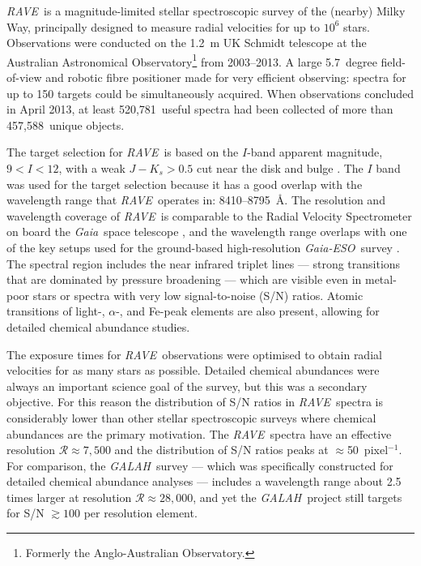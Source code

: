 \documentclass[preprint]{aastex}
\newcommand{\acronym}[1]{{\small{#1}}}
\newcommand{\project}[1]{\textsl{#1}}
\newcommand{\gaia}{\project{Gaia}}
\newcommand{\rave}{\project{\acronym{RAVE}}}
\newcommand{\galah}{\project{\acronym{GALAH}}}
\newcommand{\ges}{\project{Gaia-ESO}}
\newcommand{\Nspectra}{520,781}
\newcommand{\Nstars}{457,588}
\begin{document}
\rave\ is a magnitude-limited stellar spectroscopic survey of the (nearby) Milky Way,
principally designed to measure radial velocities for up to $10^6$ stars.
Observations were conducted on the 1.2~m UK Schmidt telescope at the Australian 
Astronomical Observatory\footnote{Formerly the Anglo-Australian Observatory.} from 
2003--2013.  A large 5.7~degree field-of-view and robotic fibre positioner made for 
very efficient observing:  spectra for up to 150 targets could be simultaneously
acquired.  When observations concluded in April 2013, at least \Nspectra\ useful 
spectra had been collected of more than \Nstars\ unique objects. 


The target selection for \rave\ is based on the $I$-band apparent magnitude,
$9 < I < 12$, with a weak $J - K_s > 0.5$ cut near the disk and bulge \citep{Wojno_2016}.  
The $I$ band was used for the target selection because it has a good overlap with the
wavelength range that \rave\ operates in:  8410--8795~\AA.  The resolution and 
wavelength coverage of \rave\ is comparable to the Radial Velocity Spectrometer on
board the \gaia\ space telescope \citep{Munari_2005,Kordopatis_2011,Recio-Blanco_2016}, 
and the wavelength range overlaps with one of the key setups used for the ground-based 
high-resolution \ges\ survey \citep{Gilmore_2012,Randich_2013}.  The spectral region 
includes the  near infrared triplet lines --- strong transitions that 
are dominated by pressure broadening --- which are visible even in metal-poor stars
or spectra with very low signal-to-noise (S/N) ratios.  Atomic transitions of 
light-, $\alpha$-, and Fe-peak elements are also present, allowing for detailed 
chemical abundance studies.


The exposure times for \rave\ observations were optimised to obtain radial 
velocities for as many stars as possible.  Detailed chemical abundances were
always an important science goal of the survey, but this was a secondary objective.  
For this reason the distribution of S/N ratios in \rave\ spectra is considerably 
lower than other stellar spectroscopic surveys where chemical abundances are the 
primary motivation.  The \rave\ spectra have an effective resolution 
$\mathcal{R} \approx 7{,}500$ and the distribution of S/N ratios peaks at 
$\approx$50~pixel$^{-1}$.  For comparison, the \galah\ survey 
\citep{DeSilva_2015} --- which was specifically constructed for detailed chemical 
abundance analyses --- includes a wavelength range about 2.5 times larger at 
resolution $\mathcal{R} \approx 28{,}000$, and yet the \galah\ project still 
targets for S/N $\gtrsim100$ per resolution element.
\end{document}
